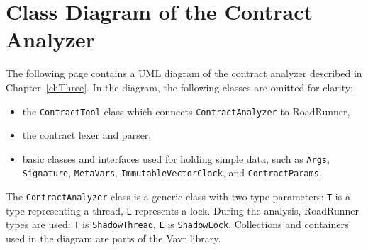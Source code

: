 \chapter{Class Diagram of the Contract Analyzer}
\label{diagram}

The following page contains a UML diagram of the contract analyzer described in
Chapter~\ref{chThree}. In the diagram, the following classes are omitted for
clarity:
\begin{itemize}
    \item the \texttt{ContractTool} class which connects
    \texttt{ContractAnalyzer} to RoadRunner,
    \item the contract lexer and parser,
    \item basic classes and interfaces used for holding simple data, such as
    \texttt{Args}, \texttt{Signature}, \texttt{MetaVars},
    \texttt{ImmutableVectorClock}, and \texttt{ContractParams}.
\end{itemize}

The \texttt{ContractAnalyzer} class is a generic class with two type parameters:
\texttt{T} is a type representing a thread, \texttt{L} represents a lock. During
the analysis, RoadRunner types are used: \texttt{T} is \texttt{ShadowThread},
\texttt{L} is \texttt{ShadowLock}. Collections and containers used in the
diagram are parts of the Vavr library.

\pagebreak

